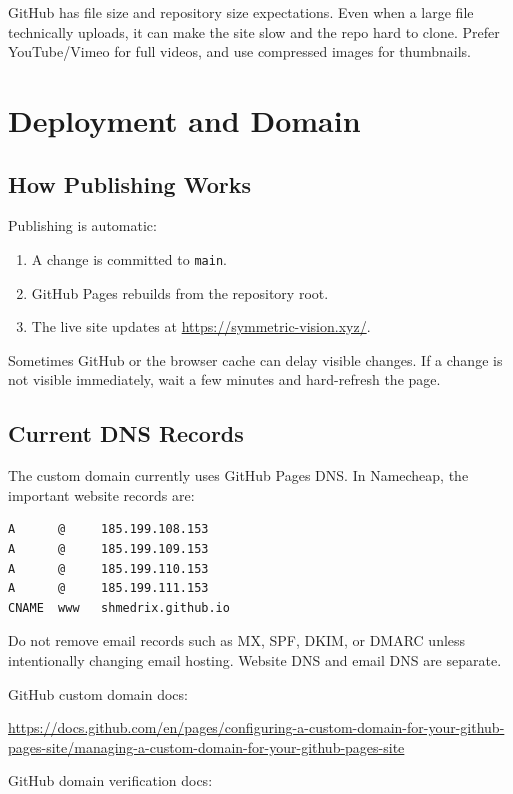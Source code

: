 \documentclass[11pt]{article}
\begin{document}
GitHub has file size and repository size expectations. Even when a large file technically uploads, it can make the site slow and the repo hard to clone. Prefer YouTube/Vimeo for full videos, and use compressed images for thumbnails.

\section{Deployment and Domain}

\subsection{How Publishing Works}

Publishing is automatic:

\begin{enumerate}
  \item A change is committed to \texttt{main}.
  \item GitHub Pages rebuilds from the repository root.
  \item The live site updates at \url{https://symmetric-vision.xyz/}.
\end{enumerate}

Sometimes GitHub or the browser cache can delay visible changes. If a change is not visible immediately, wait a few minutes and hard-refresh the page.

\subsection{Current DNS Records}

The custom domain currently uses GitHub Pages DNS. In Namecheap, the important website records are:

\begin{lstlisting}
A      @     185.199.108.153
A      @     185.199.109.153
A      @     185.199.110.153
A      @     185.199.111.153
CNAME  www   shmedrix.github.io
\end{lstlisting}

Do not remove email records such as MX, SPF, DKIM, or DMARC unless intentionally changing email hosting. Website DNS and email DNS are separate.

GitHub custom domain docs:

\url{https://docs.github.com/en/pages/configuring-a-custom-domain-for-your-github-pages-site/managing-a-custom-domain-for-your-github-pages-site}

GitHub domain verification docs:
\end{document}
